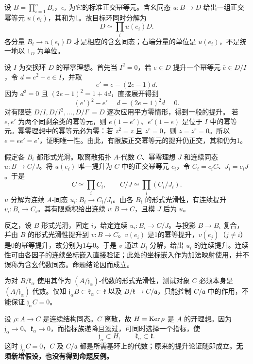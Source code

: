 设 $B=\prod_{i=1}^nB_i$，$e_i$ 为它的标准正交幂等元。含幺同态 $u:B\to D$ 给出一组正交幂等元 $u(e_i)$，其和为1。故目标环同时分解为
\[
 D\simeq\prod_i u(e_i)D.
\]
各分量 $B_i\to u(e_i)D$ 才是相应的含幺同态；右端分量的单位是 $u(e_i)$，不是统一地以 $1_D$ 为单位。

设 $I$ 为交换环 $D$ 的幂零理想。首先当 $I^2=0$，若 $e\in D$ 提升一个幂等元 $\bar e\in D/I$，令 $d=e^2-e\in I$，并取
\[
 e'=e-(2e-1)d.
\]
因为 $d^2=0$ 且 $(2e-1)^2=1+4d$，直接展开得到
\[
 (e')^2-e'=d-(2e-1)^2d=0.
\]
对有限链 $D/I,D/I^2,\ldots,D/I^r=D$ 逐次应用平方零情形，得到一般的提升。
若 $e,e'$ 为两个同剩余类的幂等元，则 $e(1-e')$、$e'(1-e)$ 是位于 $I$ 中的幂等元。幂零理想中的幂等元必为零：若 $z^2=z$ 且 $z^r=0$，则 $z=z^r=0$。所以 $e=ee'=e'$，证明唯一性。由此，有限族正交幂等元的提升仍正交，其和仍为1。

假定各 $B_i$ 都形式光滑。取离散拓扑 $A$-代数 $C$、幂零理想 $J$ 和连续同态
$u:B\to C/J$。将 $u(e_i)$ 唯一提升为 $C$ 中的正交幂等元 $c_i$，令 $C_i=c_iC$、$J_i=c_iJ$。于是
\[
 C\simeq\prod_iC_i,\qquad C/J\simeq\prod_i(C_i/J_i).
\]
$u$ 分解为连续 $A$-同态 $u_i:B_i\to C_i/J_i$。由各 $B_i$ 的形式光滑性，有连续提升 $v_i:B_i\to C_i$。其有限乘积给出连续 $v:B\to C$，且模 $J$ 后为 $u$。

反之，设 $B$ 形式光滑，固定 $i$，给定连续 $u_i:B_i\to C/J$。与投影 $B\to B_i$ 复合，并由 $B$ 的形式光滑性提升到 $v:B\to C$。$v(e_i)$ 是1的幂等提升，$v(e_j)$（$j\ne i$）是0的幂等提升，故分别为1与0。于是 $v$ 通过 $B_i$ 分解，给出 $u_i$ 的连续提升。连续性可由各因子的连续坐标嵌入直接验证；此处的坐标嵌入作为加法映射使用，并不误称为含幺代数同态。命题结论因而成立。

为对 $B/\mathfrak k_\alpha$ 使用其作为 $(A/\mathfrak j_\alpha)$-代数的形式光滑性，测试对象 $C$ 必须本身是 $(A/\mathfrak j_\alpha)$-代数。仅知
$\mathfrak j_\alpha B\subset\mathfrak k_\alpha\subset\mathfrak k$
以及 $B/\mathfrak k\to C/\mathfrak a$，只能控制 $C/\mathfrak a$ 中的作用，不能保证 $\mathfrak j_\alpha C=0$。

设 $\rho:A\to C$ 是连续结构同态。$C$ 离散，故 $H=\operatorname{Ker}\rho$ 是 $A$ 的开理想。因为 $\mathfrak j_\alpha\to0$、$\mathfrak k_\alpha\to0$，而指标族递降且滤过，可同时选择一个指标，使
\[
 \mathfrak j_\alpha\subset H,\qquad
 \mathfrak k_\alpha\subset\mathfrak k.
\]
这时 $\mathfrak j_\alpha C=0$，$C$ 及 $C/\mathfrak a$ 都是所需基环上的代数；原来的提升论证随即成立。\textbf{无须新增假设，也没有得到命题反例。}


